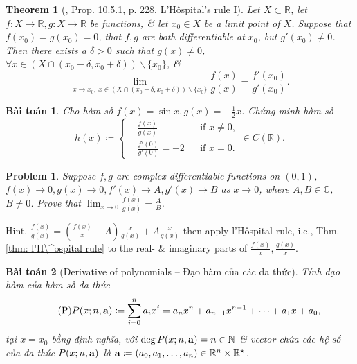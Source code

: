 \documentclass[oneside]{book}
\newtheorem{baitoan}{Bài toán}
\newtheorem{problem}{Problem}
\newtheorem{theorem}{Theorem}
\begin{document}
\begin{theorem}[\cite{Tao_analysis_1}, Prop. 10.5.1, p. 228, L'H\^ospital's rule I]
	Let $X\subset\mathbb{R}$, let $f:X\to\mathbb{R},g:X\to\mathbb{R}$ be functions, \& let $x_0\in X$ be a limit point of $X$. Suppose that $f(x_0) = g(x_0) = 0$, that $f,g$ are both differentiable at $x_0$, but $g'(x_0)\ne0$. Then there exists a $\delta > 0$ such that $g(x)\ne0$, $\forall x\in(X\cap(x_0 - \delta,x_0 + \delta))\backslash\{x_0\}$, \&
	\begin{equation*}
		\lim_{x\to x_0,\ x\in(X\cap(x_0 - \delta,x_0 + \delta))\backslash\{x_0\}} \frac{f(x)}{g(x)} = \frac{f'(x_0)}{g'(x_0)}.
	\end{equation*}
\end{theorem}

\begin{baitoan}
	Cho hàm số $f(x) = \sin x,g(x) = -\frac{1}{2}x$. Chứng minh hàm số
	\begin{equation*}
		h(x)\coloneqq\left\{\begin{split}
			&\frac{f(x)}{g(x)}&&\mbox{if } x\ne0,\\
			&\frac{f'(0)}{g'(0)} = -2&&\mbox{if } x = 0.
		\end{split}\right.\in C(\mathbb{R}).
	\end{equation*}
\end{baitoan}

\begin{problem}
	Suppose $f,g$ are complex differentiable functions on $(0,1)$, $f(x)\to0,g(x)\to0,f'(x)\to A,g'(x)\to B$ as $x\to0$, where $A,B\in\mathbb{C}$, $B\ne0$. Prove that $\lim_{x\to0} \frac{f(x)}{g(x)} = \frac{A}{B}$.
\end{problem}
{\sf Hint.} $\frac{f(x)}{g(x)} = \left(\frac{f(x)}{x} - A\right)\frac{x}{g(x)} + A\frac{x}{g(x)}$ then apply l'H\^ospital rule, i.e., Thm. \ref{thm: l'H\^ospital rule} to the real- \& imaginary parts of $\frac{f(x)}{x},\frac{g(x)}{x}$.


\begin{baitoan}[Derivative of polynomials -- Đạo hàm của các đa thức]
	Tính đạo hàm của hàm số đa thức
	\begin{equation}
		\label{polynomial}
		\tag{P}
		P(x;n,{\bf a})\coloneqq\sum_{i=0}^n a_ix^i = a_nx^n + a_{n-1}x^{n-1} + \cdots + a_1x + a_0,
	\end{equation}
	tại $x = x_0$ bằng định nghĩa, với $\deg P(x;n,{\bf a}) = n\in\mathbb{N}$ \& vector chứa các hệ số của đa thức $P(x;n,{\bf a})$ là ${\bf a}\coloneqq(a_0,a_1,\ldots,a_n)\in\mathbb{R}^n\times\mathbb{R}^\star$.
\end{baitoan}
\end{document}
